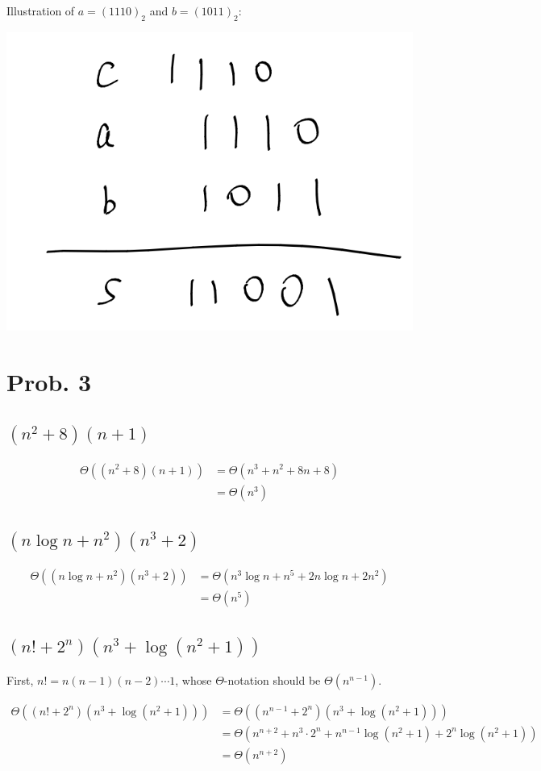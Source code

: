 \documentclass[12pt]{article}
\begin{document}
Illustration of $a = (1110)_2$ and $b = (1011)_2$:

\includegraphics[Illustration]{pics/as2prob2.1.png}

\section{Prob. 3}

\subsection{$(n^2+8)(n+1)$}
$$
\begin{aligned}
\Theta((n^2+8)(n+1)) &= \Theta(n^3 + n^2 + 8n + 8) \\
&= \Theta(n^3)
\end{aligned}
$$

\subsection{$(n\log n + n^2)(n^3+2)$}
$$
\begin{aligned}
\Theta((n\log n + n^2)(n^3+2)) &= \Theta(n^3 \log n + n^5 + 2n \log n + 2n^2) \\
&= \Theta(n^5)
\end{aligned}
$$

\subsection{$(n!+2^n)(n^3+\log{(n^2+1)})$}
First, $n! = n(n-1)(n-2)\cdots 1$, whose $\Theta$-notation should be $\Theta(n^{n-1})$.


$$
\begin{aligned}
\Theta((n!+2^n)(n^3+\log{(n^2+1)})) &= \Theta((n^{n-1}+2^n)(n^3+\log{(n^2+1)})) \\
&= \Theta(n^{n+2} + n^{3}\cdot 2^n + n^{n-1} \log{(n^2+1)} + 2^n \log{(n^2+1)}) \\
&= \Theta(n^{n+2})
\end{aligned}
$$
\end{document}
